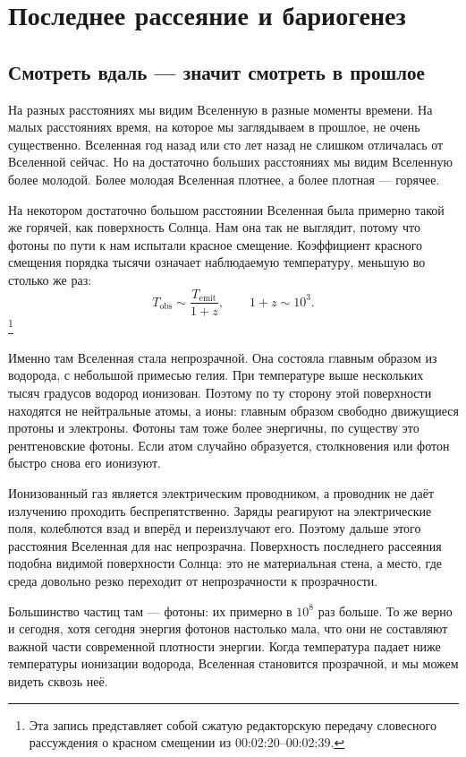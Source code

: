 \chapter{Последнее рассеяние и бариогенез}

\section{Смотреть вдаль — значит смотреть в прошлое}

На разных расстояниях мы видим Вселенную в разные моменты времени. На малых расстояниях время, на которое мы заглядываем в прошлое, не очень существенно. Вселенная год назад или сто лет назад не слишком отличалась от Вселенной сейчас. Но на достаточно больших расстояниях мы видим Вселенную более молодой. Более молодая Вселенная плотнее, а более плотная — горячее.

На некотором достаточно большом расстоянии Вселенная была примерно такой же горячей, как поверхность Солнца. Нам она так не выглядит, потому что фотоны по пути к нам испытали красное смещение. Коэффициент красного смещения порядка тысячи означает наблюдаемую температуру, меньшую во столько же раз:
\[
T_{\mathrm{obs}} \sim \frac{T_{\mathrm{emit}}}{1+z},
\qquad
1+z \sim 10^3.
\]\footnote{Эта запись представляет собой сжатую редакторскую передачу словесного рассуждения о красном смещении из 00:02:20--00:02:39.}

Именно там Вселенная стала непрозрачной. Она состояла главным образом из водорода, с небольшой примесью гелия. При температуре выше нескольких тысяч градусов водород ионизован. Поэтому по ту сторону этой поверхности находятся не нейтральные атомы, а ионы: главным образом свободно движущиеся протоны и электроны. Фотоны там тоже более энергичны, по существу это рентгеновские фотоны. Если атом случайно образуется, столкновения или фотон быстро снова его ионизуют.

Ионизованный газ является электрическим проводником, а проводник не даёт излучению проходить беспрепятственно. Заряды реагируют на электрические поля, колеблются взад и вперёд и переизлучают его. Поэтому дальше этого расстояния Вселенная для нас непрозрачна. Поверхность последнего рассеяния подобна видимой поверхности Солнца: это не материальная стена, а место, где среда довольно резко переходит от непрозрачности к прозрачности.

Большинство частиц там — фотоны: их примерно в \(10^8\) раз больше. То же верно и сегодня, хотя сегодня энергия фотонов настолько мала, что они не составляют важной части современной плотности энергии. Когда температура падает ниже температуры ионизации водорода, Вселенная становится прозрачной, и мы можем видеть сквозь неё.


